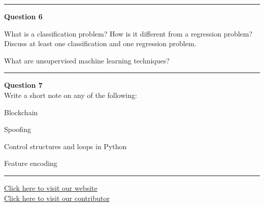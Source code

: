 \documentclass[11pt,a4paper]{article}
\begin{document}
\medskip\rule{\linewidth}{0.2pt}\medskip




\noindent   \textbf{Question 6}

\begin{parts}
  \item What is a classification problem? How is it different from a regression problem? Discuss at least one classification and one regression problem.
  \item What are unsupervised machine learning techniques?
\end{parts}

\medskip\rule{\linewidth}{0.2pt}\medskip




\noindent   \textbf{Question 7} \\
Write a short note on any of the following:

\begin{parts}
  \item Blockchain
  \item Spoofing
  \item Control structures and loops in Python
  \item Feature encoding
\end{parts}

\vfill\rule{\linewidth}{0.4pt}

\begin{center}\small
\href{https://bhu-exam.vercel.app/}{Click here to visit our website}\\[4pt]
\href{https://me-aryan.vercel.app/}{Click here to visit our contributor}
\end{center}
\end{document}
